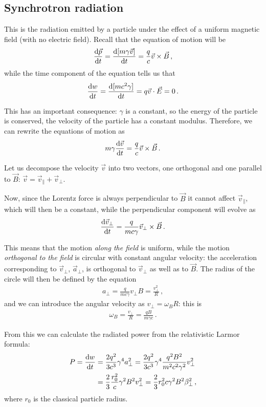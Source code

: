 \documentclass[main.tex]{subfiles}
\begin{document}
\subsection{Synchrotron radiation}

This is the radiation emitted by a particle under the effect of a uniform magnetic field (with no electric field). 
Recall that the equation of motion will be 
%
\begin{align}
\dv{\vec{p}}{t} = \dv{[m \gamma \vec{v}]}{t} = \frac{q}{c} \vec{v} \times \vec{B}
\,,
\end{align}
%
while the time component of the equation tells us that 
%
\begin{align}
\dv{w}{t} = \dv{[m c^2 \gamma ]}{t} = q \vec{v} \cdot \vec{E}  =0 
\,.
\end{align}

This has an important consequence: \(\gamma \) is a constant, so the energy of the particle is conserved, the velocity of the particle has a constant modulus. Therefore, we can rewrite the equations of motion as 
%
\begin{align}
m \gamma \dv{\vec{v}}{t} = \frac{q}{c} \vec{v} \times \vec{B}
\,.
\end{align}

Let us decompose the velocity \(\vec{v}\) into two vectors, one orthogonal and one parallel to \(\vec{B}\): \(\vec{v} = \vec{v}_{\parallel} + \vec{v}_{\perp}\). 

Now, since the Lorentz force is always perpendicular to \(\vec{B}\) it cannot affect \(\vec{v}_\parallel\), which will then be a constant, while the perpendicular component will evolve as 
%
\begin{align}
\dv{\vec{v}_{\perp}}{t} = \frac{q}{mc \gamma } \vec{v}_{\perp} \times \vec{B}
\,.
\end{align}

This means that the motion \emph{along the field} is uniform, while the motion \emph{orthogonal to the field} is circular with constant angular velocity: the acceleration corresponding to \(\vec{v} _\perp\), \(\vec{a}_\perp\), is orthogonal to \(\vec{v}_\perp\) as well as to \(\vec{B}\).
The radius of the circle will then be defined by the equation 
%
\begin{align}
a_\perp = \frac{q}{mc \gamma } v_\perp B = \frac{v_\perp^2}{R}
\,,
\end{align}
%
and we can introduce the angular velocity as \(v_\perp = \omega _B R \): this is 
%
\begin{align}
\omega _B = \frac{v_\perp}{R} = \frac{qB}{m \gamma c}
\,.
\end{align}

From this we can calculate the radiated power from the relativistic Larmor formula: 
%
\begin{align}
P = \dv{w}{t} &= \frac{2 q^2}{3 c^3} \gamma^{4} a^2_\perp 
= \frac{2q^2}{3c^3} \gamma^{4} \frac{q^2B^2}{m^2c^2\gamma^2} v_\perp^2  \\
&= \frac{2}{3} \frac{r_0^2}{c} \gamma^2 B^2 v_\perp^2 
= \frac{2}{3} r_0^2 c \gamma^2 B^2 \beta_\perp^2
\,,
\end{align}
%
where \(r_0 \) is the classical particle radius. 
\end{document}
